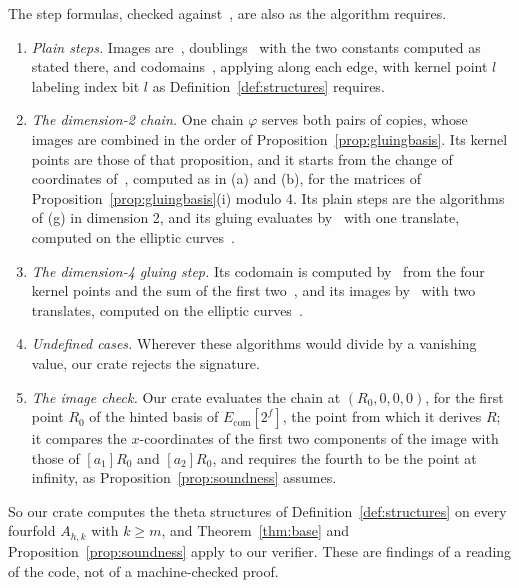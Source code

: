\documentclass[version=preprint]{iacrcc}
\newcommand{\Ecom}{E_{\mathrm{com}}}
\begin{document}
\begin{remark}[Conformance]
        The step formulas, checked against~\cite{Dar24}, are also as the
        algorithm requires.
        \begin{enumerate}[label=(\alph*), resume]
            \item \emph{Plain steps.} Images are~\cite[Algorithm 1]{Dar24},
            doublings~\cite[Algorithm 8]{Dar24} with the two constants computed as
            stated there, and codomains~\cite[Algorithms 2--4]{Dar24}, applying
            \cite[Eq.~(21)]{Dar24} along each edge, with kernel point $l$ labeling
            index bit $l$ as Definition~\ref{def:structures} requires.
            \item \emph{The dimension-2 chain.} One chain $\varphi$ serves both
            pairs of copies, whose images are combined in the order of
            Proposition~\ref{prop:gluingbasis}. Its kernel points are those of
            that proposition, and it starts from the change of coordinates
            of~\cite[Theorem 12]{Dar24}, computed as in (a) and (b), for the
            matrices of Proposition~\ref{prop:gluingbasis}(i) modulo 4. Its plain
            steps are the algorithms of (g) in dimension 2, and its gluing
            evaluates by~\cite[Eqs.~(20), (24) and (25)]{Dar24} with one translate,
            computed on the elliptic curves~\cite[Remarks 19 and 20]{Dar24}.
            \item \emph{The dimension-4 gluing step.} Its codomain is computed
            by~\cite[Algorithm 4]{Dar24} from the four kernel points and the sum of
            the first two~\cite[Remark 21]{Dar24}, and its images
            by~\cite[Algorithm 5]{Dar24} with two translates, computed on the
            elliptic curves~\cite[Remarks 19 and 20]{Dar24}.
            \item \emph{Undefined cases.} Wherever these algorithms would divide by
            a vanishing value, our crate rejects the signature.
            \item \emph{The image check.} Our crate evaluates the chain at
            $(R_0, 0, 0, 0)$, for the first point $R_0$ of the hinted basis of
            $\Ecom[2^f]$, the point from which it derives $R$; it compares the
            $x$-coordinates of the first two components of the image with
            those of $[a_1]R_0$ and $[a_2]R_0$, and requires the fourth to be the
            point at infinity, as Proposition~\ref{prop:soundness} assumes.
        \end{enumerate}
        So our crate computes the theta structures of
        Definition~\ref{def:structures} on every fourfold $A_{h,k}$ with $k \ge
        m$, and Theorem~\ref{thm:base} and Proposition~\ref{prop:soundness} apply
        to our verifier. These are
        findings of a reading of the code, not of a machine-checked proof.
    \end{remark}
\end{document}
